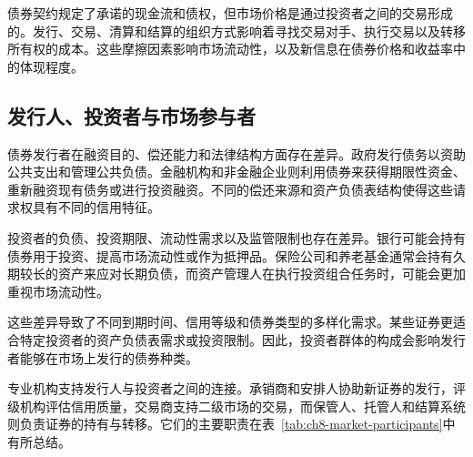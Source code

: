 债券契约规定了承诺的现金流和债权，但市场价格是通过投资者之间的交易形成的。发行、交易、清算和结算的组织方式影响着寻找交易对手、执行交易以及转移所有权的成本。这些摩擦因素影响市场流动性，以及新信息在债券价格和收益率中的体现程度。

\subsection{发行人、投资者与市场参与者}

债券发行者在融资目的、偿还能力和法律结构方面存在差异。政府发行债务以资助公共支出和管理公共负债。金融机构和非金融企业则利用债券来获得期限性资金、重新融资现有债务或进行投资融资。不同的偿还来源和资产负债表结构使得这些请求权具有不同的信用特征。

投资者的负债、投资期限、流动性需求以及监管限制也存在差异。银行可能会持有债券用于投资、提高市场流动性或作为抵押品。保险公司和养老基金通常会持有久期较长的资产来应对长期负债，而资产管理人在执行投资组合任务时，可能会更加重视市场流动性。

这些差异导致了不同到期时间、信用等级和债券类型的多样化需求。某些证券更适合特定投资者的资产负债表需求或投资限制。因此，投资者群体的构成会影响发行者能够在市场上发行的债券种类。

专业机构支持发行人与投资者之间的连接。承销商和安排人协助新证券的发行，评级机构评估信用质量，交易商支持二级市场的交易，而保管人、托管人和结算系统则负责证券的持有与转移。它们的主要职责在表~\ref{tab:ch8-market-participants}中有所总结。


